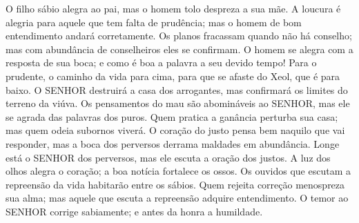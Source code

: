 {  O filho sábio alegra ao pai, mas o homem tolo despreza a sua mãe.
  A loucura é alegria para aquele que tem falta de prudência; mas o homem de bom entendimento andará corretamente.
  Os planos fracassam quando não há
{} conselho; mas com abundância de conselheiros eles se confirmam.
  O homem se alegra com a resposta de sua boca; e como é boa a palavra a seu devido tempo!
  Para o prudente, o caminho da vida
{} para cima, para que se afaste do Xeol,
 que é para baixo.
  O SENHOR destruirá a casa dos arrogantes, mas confirmará os limites do terreno da viúva.
  Os pensamentos do mau são abomináveis ao SENHOR, mas ele se agrada das palavras dos puros.
  Quem pratica a ganância perturba sua
{} casa; mas quem odeia subornos viverá.
  O coração do justo pensa bem naquilo que vai responder, mas a boca dos perversos derrama maldades em abundância.
  Longe está o SENHOR dos perversos, mas ele escuta a oração dos justos.
  A luz dos olhos alegra o coração; a boa notícia fortalece os ossos.
  Os ouvidos que escutam a repreensão da vida habitarão entre os sábios.
  Quem rejeita correção menospreza sua
{} alma; mas aquele que escuta a repreensão adquire entendimento.
  O temor ao SENHOR corrige sabiamente; e antes da honra
{} a humildade.
\par }

